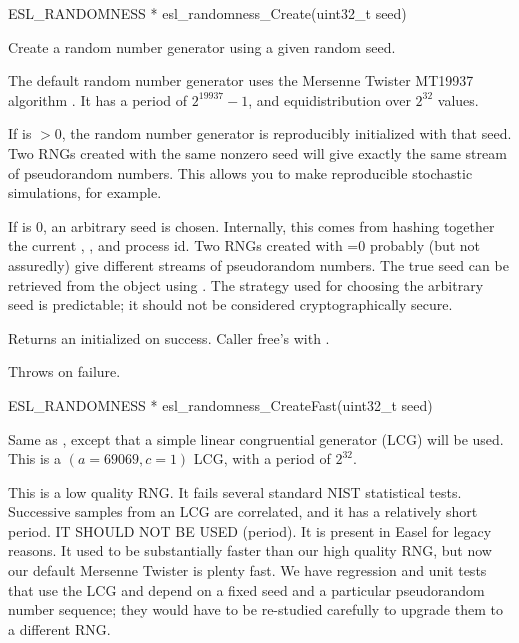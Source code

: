\begin{sreapi}
\hypertarget{func:esl_randomness_Create()}
{\item[ESL\_RANDOMNESS * esl\_randomness\_Create(uint32\_t seed)]}

Create a random number generator using
a given random seed. 

The default random number generator uses the Mersenne
Twister MT19937 algorithm \citep{Matsumoto98}.  It has a
period of $2^{19937}-1$, and equidistribution over
$2^{32}$ values.

If  is $>0$, the random number generator is
reproducibly initialized with that seed.  Two RNGs
created with the same nonzero seed will give exactly the
same stream of pseudorandom numbers. This allows you to
make reproducible stochastic simulations, for example.

If  is 0, an arbitrary seed is chosen.
Internally, this comes from hashing together the current
, , and process id.  Two RNGs created
with =0 probably (but not assuredly) give
different streams of pseudorandom numbers. The true seed
can be retrieved from the  object using
.  The strategy used for
choosing the arbitrary seed is predictable; it should
not be considered cryptographically secure.

Returns an initialized  on success.
Caller free's with .

Throws  on failure.



\hypertarget{func:esl_randomness_CreateFast()}
{\item[ESL\_RANDOMNESS * esl\_randomness\_CreateFast(uint32\_t seed)]}

Same as , except that a simple
linear congruential generator (LCG) will be used.
This is a $(a=69069, c=1)$ LCG, with a period of
$2^{32}$. 

This is a low quality RNG. It fails several standard
NIST statistical tests. Successive samples from an LCG
are correlated, and it has a relatively short period. IT
SHOULD NOT BE USED (period). It is present in Easel for
legacy reasons. It used to be substantially faster than
our high quality RNG, but now our default Mersenne
Twister is plenty fast. We have regression and unit
tests that use the LCG and depend on a fixed seed and a
particular pseudorandom number sequence; they would have
to be re-studied carefully to upgrade them to a
different RNG.


\end{sreapi}
